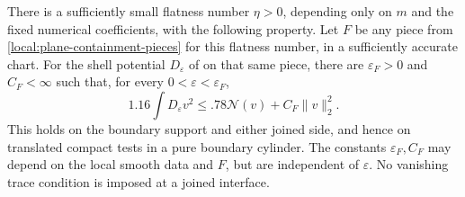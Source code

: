 \begin{proposition}\label{local:sharp}
There is a sufficiently small flatness number $\eta>0$, depending
only on $m$ and the fixed numerical coefficients, with the following
property.  Let $F$ be any piece from \cref{local:plane-containment-pieces} for this
flatness number, in a sufficiently accurate chart.  For the shell potential $D_\varepsilon$ of 
on that same piece, there are $\varepsilon_F>0$ and $C_F<\infty$
such that, for every $0<\varepsilon<\varepsilon_F$,
\begin{equation}\label{local:sharp-estimate}
 1.16\int D_\varepsilon v^2
           \le .78\mathcal N(v)+C_F\|v\|_2^2.
\end{equation}
This holds on the boundary support and either joined side, and hence on
translated compact tests in a pure boundary cylinder.  The constants
$\varepsilon_F,C_F$ may depend on the local smooth data and $F$,
but are independent of $\varepsilon$.  No vanishing trace condition
is imposed at a joined interface.
\end{proposition}
